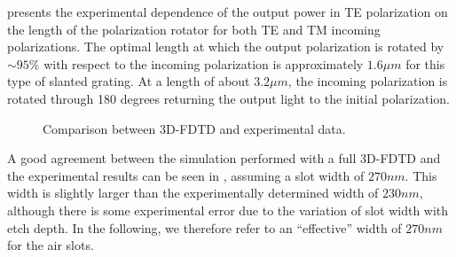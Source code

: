  presents the experimental dependence of the output
power in TE polarization on the length of the polarization rotator for
both TE and TM incoming polarizations. The optimal length at which the output polarization
is rotated by $\sim 95\%$ with respect to the incoming polarization
is approximately $1.6 \mu m$ for this type of slanted grating. At a
length of about $3.2 \mu m$, the incoming polarization is rotated
through 180 degrees returning the output light to the initial
polarization.

\begin{figure}[htbp]
  \begin{center}
  \end{center}
  \caption{Comparison between 3D-FDTD and experimental data.}
  \label{fig:polrot_figg}
\end{figure}

A good agreement between the simulation performed with a full 3D-FDTD
and the experimental results can be seen in , assuming a slot
width of $270 nm$. This width is slightly larger than the experimentally
determined width of $230 nm$, although there is some experimental error
due to the variation of slot width with etch depth. In the following,
we therefore refer to an ``effective'' width of $270nm$ for the air
slots.

